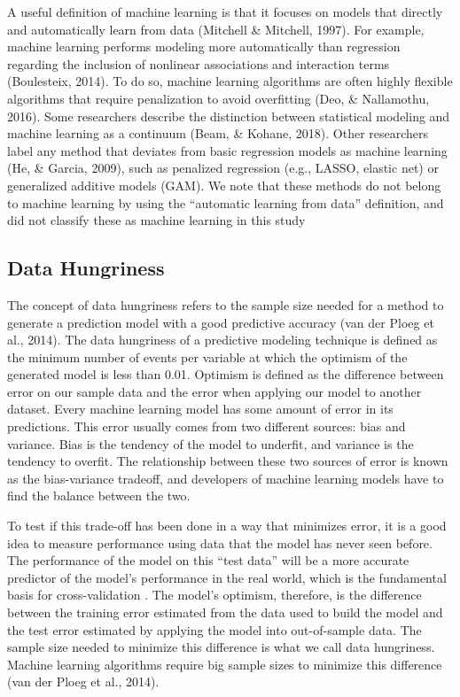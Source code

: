\documentclass[
  man]{apa6}
\begin{document}
A useful definition of machine learning is that it focuses on models that directly and automatically learn from data (Mitchell \& Mitchell, 1997). For example, machine learning performs modeling more automatically than regression regarding the inclusion of nonlinear associations and interaction terms (Boulesteix, 2014). To do so, machine learning algorithms are often highly flexible algorithms that require penalization to avoid overfitting (Deo, \& Nallamothu, 2016). Some researchers describe the distinction between statistical modeling and machine learning as a continuum (Beam, \& Kohane, 2018). Other researchers label any method that deviates from basic regression models as machine learning (He, \& Garcia, 2009), such as penalized regression (e.g., LASSO, elastic net) or generalized additive models (GAM). We note that these methods do not belong to machine learning by using the ``automatic learning from data'' definition, and did not classify these as machine learning in this study

\hypertarget{data-hungriness}{%
\subsection{Data Hungriness}\label{data-hungriness}}

The concept of data hungriness refers to the sample size needed for a method to generate a prediction model with a good predictive accuracy (van der Ploeg et al., 2014). The data hungriness of a predictive modeling technique is defined as the minimum number of events per variable at which the optimism of the generated model is less than 0.01. Optimism is defined as the difference between error on our sample data and the error when applying our model to another dataset. Every machine learning model has some amount of error in its predictions. This error usually comes from two different sources: bias and variance. Bias is the tendency of the model to underfit, and variance is the tendency to overfit. The relationship between these two sources of error is known as the bias-variance tradeoff, and developers of machine learning models have to find the balance between the two.

To test if this trade-off has been done in a way that minimizes error, it is a good idea to measure performance using data that the model has never seen before. The performance of the model on this ``test data'' will be a more accurate predictor of the model's performance in the real world, which is the fundamental basis for cross-validation . The model's optimism, therefore, is the difference between the training error estimated from the data used to build the model and the test error estimated by applying the model into out-of-sample data. The sample size needed to minimize this difference is what we call data hungriness. Machine learning algorithms require big sample sizes to minimize this difference (van der Ploeg et al., 2014).
\end{document}
